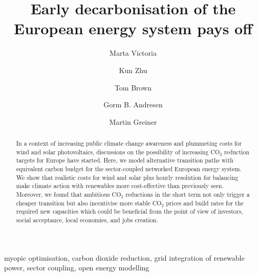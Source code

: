 \documentclass[5p]{elsarticle} %
\begin{document}
\begin{frontmatter}

\title{Early decarbonisation of the European energy system pays off}

\author[mymainaddress,iClimate]{Marta Victoria}
\author[mymainaddress]{Kun Zhu}
\author[kitaddress]{Tom Brown}
\author[mymainaddress,iClimate]{Gorm B. Andresen}
\author[mymainaddress,iClimate]{Martin Greiner}
\address[mymainaddress]{Department of Engineering, Aarhus University, Inge Lehmanns Gade 10, 8000 Aarhus, Denmark}
\address[iClimate]{iCLIMATE Interdisciplinary Centre for Climate Change, Aarhus University}
\address[kitaddress]{Institute for Automation and Applied Informatics (IAI), Karlsruhe Institute of Technology (KIT), Forschungszentrum 449, 76344, Eggenstein-Leopoldshafen, Germany}


\begin{abstract}

In a context of increasing public climate change awareness and plummeting costs for wind and solar photovoltaics, discussions on the possibility of increasing CO$_2$ reduction targets for Europe have started. Here, we model alternative transition paths with equivalent carbon budget for the sector-coupled networked European energy system. We show that realistic costs for wind and solar plus hourly resolution for balancing make climate action with renewables more cost-effective than previously seen. Moreover, we found that ambitious CO$_2$ reductions in the short term not only trigger a cheaper transition but also incentivise more stable CO$_2$ prices and build rates for the required new capacities which could be beneficial from the point of view of investors, social acceptance, local economies, and jobs creation.

\end{abstract}

\begin{keyword}
myopic optimisation, carbon dioxide reduction, grid integration of renewable power, sector coupling, open energy modelling
\end{keyword}

\end{frontmatter}
\end{document}
